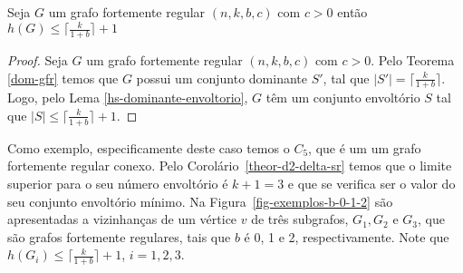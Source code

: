 \begin{coro}
Seja $G$ um grafo fortemente regular $(n,k,b,c)$ com $c>0$ então $h(G) \le \big\lceil \frac{k}{1+b} \big\rceil + 1$
\label{theor-d2-delta-sr}
\end{coro}
\begin{proof}
Seja $G$ um grafo fortemente regular $(n,k,b,c)$ com $c>0$. Pelo Teorema \ref{dom-gfr} temos que $G$ possui um conjunto dominante $S'$, tal que $|S'| = \big\lceil \frac{k}{1+b}\big\rceil$. Logo, pelo Lema \ref{hs-dominante-envoltorio}, $G$ têm um conjunto envoltório $S$ tal que $|S| \leq \big\lceil \frac{k}{1+b}\big\rceil + 1$.
\end{proof}

Como exemplo, especificamente deste caso temos o $C_5$, que é um um grafo fortemente regular conexo. Pelo Corolário~\ref{theor-d2-delta-sr} temos que o limite superior para o seu número envoltório é $k+1=3$ e que se verifica ser o valor do seu conjunto envoltório mínimo. Na Figura~\ref{fig-exemplos-b-0-1-2} são apresentadas a vizinhanças de um vértice $v$ de três subgrafos, $G_1, G_2$ e $G_3$, que são grafos fortemente regulares, tais que $b$ é 0, 1 e 2, respectivamente. Note que $h(G_i) \leq \big\lceil \frac{k}{1+b}\big\rceil + 1$, $i=1, 2, 3$.

